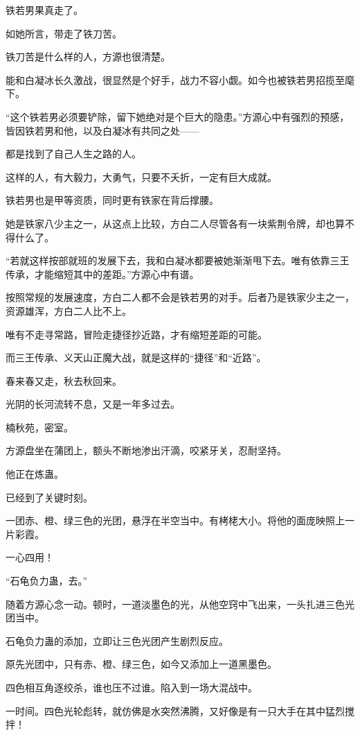 
\begin{this_body}

铁若男果真走了。

如她所言，带走了铁刀苦。

铁刀苦是什么样的人，方源也很清楚。

能和白凝冰长久激战，很显然是个好手，战力不容小觑。如今也被铁若男招揽至麾下。

“这个铁若男必须要铲除，留下她绝对是个巨大的隐患。”方源心中有强烈的预感，皆因铁若男和他，以及白凝冰有共同之处——

都是找到了自己人生之路的人。

这样的人，有大毅力，大勇气，只要不夭折，一定有巨大成就。

铁若男也是甲等资质，同时更有铁家在背后撑腰。

她是铁家八少主之一，从这点上比较，方白二人尽管各有一块紫荆令牌，却也算不得什么了。

“若就这样按部就班的发展下去，我和白凝冰都要被她渐渐甩下去。唯有依靠三王传承，才能缩短其中的差距。”方源心中有谱。

按照常规的发展速度，方白二人都不会是铁若男的对手。后者乃是铁家少主之一，资源雄浑，方白二人比不上。

唯有不走寻常路，冒险走捷径抄近路，才有缩短差距的可能。

而三王传承、义天山正魔大战，就是这样的“捷径”和“近路”。

春来春又走，秋去秋回来。

光阴的长河流转不息，又是一年多过去。

楠秋苑，密室。

方源盘坐在蒲团上，额头不断地渗出汗滴，咬紧牙关，忍耐坚持。

他正在炼蛊。

已经到了关键时刻。

一团赤、橙、绿三色的光团，悬浮在半空当中。有栲栳大小。将他的面庞映照上一片彩霞。

一心四用！

“石龟负力蛊，去。”

随着方源心念一动。顿时，一道淡墨色的光，从他空窍中飞出来，一头扎进三色光团当中。

石龟负力蛊的添加，立即让三色光团产生剧烈反应。

原先光团中，只有赤、橙、绿三色，如今又添加上一道黑墨色。

四色相互角逐绞杀，谁也压不过谁。陷入到一场大混战中。

一时间。四色光轮彪转，就仿佛是水突然沸腾，又好像是有一只大手在其中猛烈搅拌！


\end{this_body}
